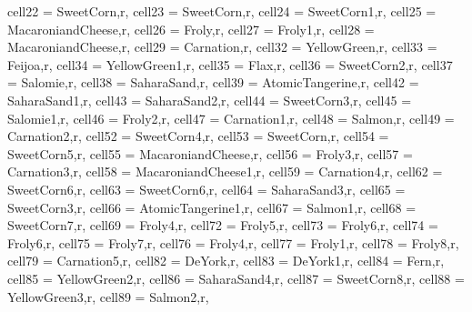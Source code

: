 \begin{table}[H]
	\centering
	\fontsize{10pt}{12pt}\selectfont
	\begin{adjustbox}{width=\textwidth}
		\begin{tblr}{
				cell{2}{2} = {SweetCorn,r},
				cell{2}{3} = {SweetCorn,r},
				cell{2}{4} = {SweetCorn1,r},
				cell{2}{5} = {MacaroniandCheese,r},
				cell{2}{6} = {Froly,r},
				cell{2}{7} = {Froly1,r},
				cell{2}{8} = {MacaroniandCheese,r},
				cell{2}{9} = {Carnation,r},
				cell{3}{2} = {YellowGreen,r},
				cell{3}{3} = {Feijoa,r},
				cell{3}{4} = {YellowGreen1,r},
				cell{3}{5} = {Flax,r},
				cell{3}{6} = {SweetCorn2,r},
				cell{3}{7} = {Salomie,r},
				cell{3}{8} = {SaharaSand,r},
				cell{3}{9} = {AtomicTangerine,r},
				cell{4}{2} = {SaharaSand1,r},
				cell{4}{3} = {SaharaSand2,r},
				cell{4}{4} = {SweetCorn3,r},
				cell{4}{5} = {Salomie1,r},
				cell{4}{6} = {Froly2,r},
				cell{4}{7} = {Carnation1,r},
				cell{4}{8} = {Salmon,r},
				cell{4}{9} = {Carnation2,r},
				cell{5}{2} = {SweetCorn4,r},
				cell{5}{3} = {SweetCorn,r},
				cell{5}{4} = {SweetCorn5,r},
				cell{5}{5} = {MacaroniandCheese,r},
				cell{5}{6} = {Froly3,r},
				cell{5}{7} = {Carnation3,r},
				cell{5}{8} = {MacaroniandCheese1,r},
				cell{5}{9} = {Carnation4,r},
				cell{6}{2} = {SweetCorn6,r},
				cell{6}{3} = {SweetCorn6,r},
				cell{6}{4} = {SaharaSand3,r},
				cell{6}{5} = {SweetCorn3,r},
				cell{6}{6} = {AtomicTangerine1,r},
				cell{6}{7} = {Salmon1,r},
				cell{6}{8} = {SweetCorn7,r},
				cell{6}{9} = {Froly4,r},
				cell{7}{2} = {Froly5,r},
				cell{7}{3} = {Froly6,r},
				cell{7}{4} = {Froly6,r},
				cell{7}{5} = {Froly7,r},
				cell{7}{6} = {Froly4,r},
				cell{7}{7} = {Froly1,r},
				cell{7}{8} = {Froly8,r},
				cell{7}{9} = {Carnation5,r},
				cell{8}{2} = {DeYork,r},
				cell{8}{3} = {DeYork1,r},
				cell{8}{4} = {Fern,r},
				cell{8}{5} = {YellowGreen2,r},
				cell{8}{6} = {SaharaSand4,r},
				cell{8}{7} = {SweetCorn8,r},
				cell{8}{8} = {YellowGreen3,r},
				cell{8}{9} = {Salmon2,r},
}
\end{tblr}
\end{adjustbox}
\end{table}
